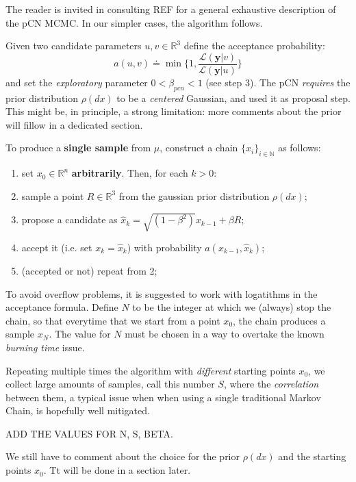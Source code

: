 \documentclass[8pt]{article}
\begin{document}
The reader is invited in consulting REF for a general exhaustive description
of the pCN MCMC. In our simpler cases, the algorithm follows.


Given two candidate parameters $u, v \in \mathbb{R}^3$
define the acceptance probability:
\begin{equation}
	a(u, v) \doteq \min \{ 1, \frac{ \mathcal{L}(\textbf{y} | v )}
				{\mathcal{L}(\textbf{y} | u)} \}
\end{equation}
and set the \emph{exploratory} parameter $0 < \beta_{pcn} < 1$
(see step 3).
The pCN \emph{requires} the prior distribution $\rho(dx)$
to be a \emph{centered} Gaussian, and used it as proposal step.
This might be, in principle, a strong limitation: more comments about the
prior will fillow in a dedicated section.


To produce a \textbf{single sample} from $\mu$, construct a chain 
$\{ x_i \} _{i \in \mathbb{N} }$ as follows:

\begin{enumerate}
	\item set $x_0 \in \mathbb{R}^n$ \textbf{arbitrarily}. Then, for each
		$k > 0$:
	\item sample a point $R \in \mathbb{R}^3$ 
		from the gaussian prior distribution $\rho(dx)$;

	\item  propose a candidate as 
		$
		\hat{x}_{k} = \sqrt{(1 - \beta^2)} x_{k-1}
			+ \beta R
		$;
	\item	accept it (i.e. set $x_{k} = \hat{x}_{k}$)
		with probability $a(x_{k-1}, \hat{x}_k)$;
	\item (accepted or not) repeat from 2;
\end{enumerate}

To avoid overflow problems, it is suggested to work with
logatithms in the acceptance formula. Define
$N$ to be the integer at which we (always) stop the chain,
so that everytime that we start from a point $x_0$,
the chain produces a sample
$x_N$. The value for $N$ must
be chosen in a way to overtake the known \emph{burning time} issue.


Repeating multiple times the algorithm with \emph{different} starting points
$x_0$,
we collect large amounts of samples, call this number $S$,
where the \emph{correlation} between them, a typical issue when
when using a single traditional Markov Chain,
is hopefully well mitigated.


ADD THE VALUES FOR N, S, BETA.


We still have to comment about the choice for the prior $\rho(dx)$ and
the starting points $x_0$. Tt will be done in a section later.
\end{document}
